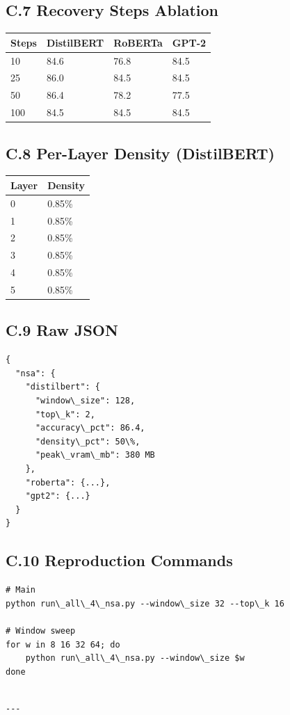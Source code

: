 \subsection{C.7 Recovery Steps Ablation}

\begin{table}[H]
\centering
\small
\begin{tabular}{llll}
\toprule
\textbf{Steps} & \textbf{DistilBERT} & \textbf{RoBERTa} & \textbf{GPT-2} \\
\midrule
10 & 84.6 & 76.8 & 84.5 \\
25 & 86.0 & 84.5 & 84.5 \\
50 & 86.4 & 78.2 & 77.5 \\
100 & 84.5 & 84.5 & 84.5 \\
\bottomrule
\end{tabular}
\end{table}

\subsection{C.8 Per-Layer Density (DistilBERT)}

\begin{table}[H]
\centering
\small
\begin{tabular}{ll}
\toprule
\textbf{Layer} & \textbf{Density} \\
\midrule
0 & 0.85\% \\
1 & 0.85\% \\
2 & 0.85\% \\
3 & 0.85\% \\
4 & 0.85\% \\
5 & 0.85\% \\
\bottomrule
\end{tabular}
\end{table}

\subsection{C.9 Raw JSON}

\begin{lstlisting}
{
  "nsa": {
    "distilbert": {
      "window\_size": 128,
      "top\_k": 2,
      "accuracy\_pct": 86.4,
      "density\_pct": 50\%,
      "peak\_vram\_mb": 380 MB
    },
    "roberta": {...},
    "gpt2": {...}
  }
}
\end{lstlisting}

\subsection{C.10 Reproduction Commands}

\begin{lstlisting}
# Main
python run\_all\_4\_nsa.py --window\_size 32 --top\_k 16

# Window sweep
for w in 8 16 32 64; do
    python run\_all\_4\_nsa.py --window\_size $w
done
\end{lstlisting}
\begin{lstlisting}

---
\end{lstlisting}